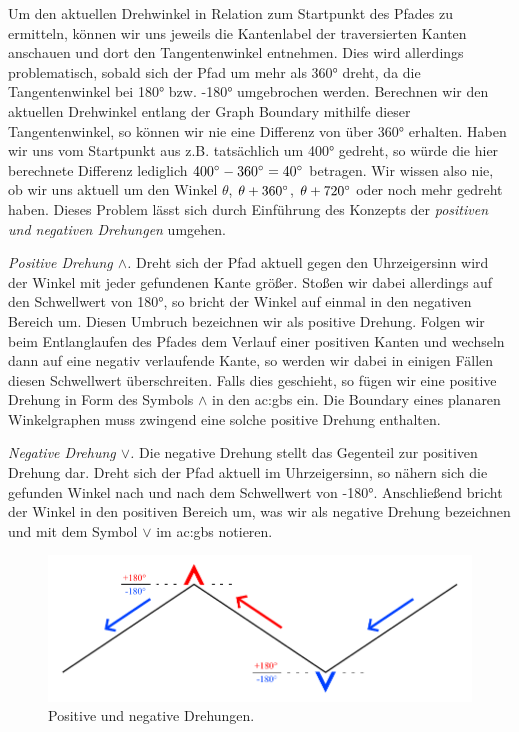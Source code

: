 Um den aktuellen Drehwinkel in Relation zum Startpunkt des Pfades zu ermitteln, können wir uns jeweils die Kantenlabel der traversierten
Kanten anschauen und dort den Tangentenwinkel entnehmen. Dies wird allerdings problematisch, sobald sich der Pfad um mehr als
360° dreht, da die Tangentenwinkel bei 180° bzw. -180° umgebrochen werden. Berechnen wir den aktuellen Drehwinkel entlang der Graph Boundary mithilfe
dieser Tangentenwinkel, so können wir nie eine Differenz von über 360° erhalten. Haben wir uns vom Startpunkt aus z.B. tatsächlich um 400°
gedreht, so würde die hier berechnete Differenz lediglich \(400\degree - 360\degree = 40\degree\) betragen. Wir wissen also nie, ob wir uns
aktuell um den Winkel \(\theta\), \(\theta + 360\degree\), \(\theta + 720\degree\) oder noch mehr gedreht haben.
Dieses Problem lässt sich durch Einführung des Konzepts der \textit{positiven und negativen Drehungen} umgehen.

\textit{Positive Drehung \(\wedge\).} Dreht sich der Pfad aktuell gegen den Uhrzeigersinn wird der Winkel mit jeder gefundenen Kante größer. Stoßen wir
dabei allerdings auf den Schwellwert von 180°, so bricht der Winkel auf einmal in den negativen Bereich um. Diesen Umbruch bezeichnen wir als
positive Drehung. Folgen wir beim Entlanglaufen des Pfades dem Verlauf einer positiven Kanten und wechseln dann auf eine negativ verlaufende Kante, so
werden wir dabei in einigen Fällen diesen Schwellwert überschreiten. Falls dies geschieht, so fügen wir eine
positive Drehung in Form des Symbols \(\wedge\) in den \gls{ac:gbs} ein. Die Boundary eines planaren Winkelgraphen muss zwingend eine
solche positive Drehung enthalten.

\textit{Negative Drehung \(\vee\).} Die negative Drehung stellt das Gegenteil zur positiven Drehung dar. Dreht sich der Pfad aktuell im
Uhrzeigersinn, so nähern sich die gefunden Winkel nach und nach dem Schwellwert von -180°. Anschließend bricht der Winkel in den positiven Bereich
um, was wir als negative Drehung bezeichnen und mit dem Symbol \(\vee\) im \gls{ac:gbs} notieren.

\begin{figure}[t]
    \centering
    \includegraphics[width=(\imgWidth*3/4)]{images/turns.pdf}
    \caption{Positive und negative Drehungen.}
    \label{fig:turns}
\end{figure}


